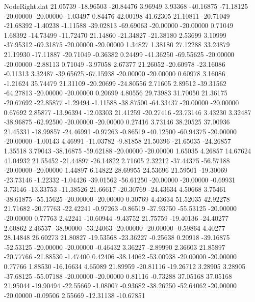 \begin{filecontents}{NodeRight.dat}
  21.05739  -18.96503  -20.84476     3.96949    3.93368  -40.16875  -71.18125  -20.00000  -20.00000   -1.03497    0.84476   42.00198   41.62305
  21.10811  -20.71049  -21.68392    -1.40238   -1.11588  -39.02813  -69.69063  -20.00000  -20.00000    0.71049    1.68392  -14.73499  -11.72470
  21.14860  -21.34827  -21.38180     2.53699    3.10999  -37.95312  -69.31875  -20.00000  -20.00000    1.34827    1.38180   27.12288   33.24879
  21.19930  -17.11887  -20.71049    -0.36382    0.24499  -41.36250  -69.55625  -20.00000  -20.00000   -2.88113    0.71049   -3.97058    2.67377
  21.26052  -20.60978  -23.16086    -0.11313    3.32487  -39.65625  -67.15938  -20.00000  -20.00000    0.60978    3.16086   -1.21624   35.74479
  21.31109  -20.20699  -24.80556     2.71605    2.89512  -39.31562  -64.27813  -20.00000  -20.00000    0.20699    4.80556   29.73983   31.70050
  21.36175  -20.67692  -22.85877    -1.29494   -1.11588  -38.87500  -64.33437  -20.00000  -20.00000    0.67692    2.85877  -13.96394  -12.03303
  21.41259  -20.27416  -23.73146     3.43230    3.32487  -38.96875  -62.92500  -20.00000  -20.00000    0.27416    3.73146   38.20525   37.00936
  21.45331  -18.99857  -24.46991    -0.97263   -0.86519  -40.12500  -60.94375  -20.00000  -20.00000   -1.00143    4.46991  -11.03782   -9.81858
  21.50396  -21.65035  -24.26857     1.35518    3.79043  -38.16875  -59.62188  -20.00000  -20.00000    1.65035    4.26857   14.67624   41.04932
  21.55452  -21.44897  -26.14822     2.71605    2.32212  -37.44375  -56.57188  -20.00000  -20.00000    1.44897    6.14822   28.69955   24.53696
  21.59501  -19.30069  -23.73146    -1.22332   -1.04426  -39.01562  -56.61250  -20.00000  -20.00000   -0.69931    3.73146  -13.33753  -11.38526
  21.66617  -20.30769  -24.43634     4.50668    3.75461  -38.61875  -55.15625  -20.00000  -20.00000    0.30769    4.43634   51.52035   42.92278
  21.71682  -20.77763  -22.42241    -0.97263   -0.86519  -37.93750  -55.53125  -20.00000  -20.00000    0.77763    2.42241  -10.60944   -9.43752
  21.75759  -19.40136  -24.40277     2.60862    2.46537  -38.90000  -53.24063  -20.00000  -20.00000   -0.59864    4.40277   28.14848   26.60273
  21.80827  -19.53568  -23.36227    -0.25638    0.20918  -39.16875  -52.53125  -20.00000  -20.00000   -0.46432    3.36227   -2.89990    2.36603
  21.85897  -20.77766  -21.88530    -1.47400    0.42406  -38.14062  -53.00938  -20.00000  -20.00000    0.77766    1.88530  -16.16634    4.65089
  21.89959  -20.81116  -19.26712     3.28905    3.28905  -37.68125  -55.07188  -20.00000  -20.00000    0.81116   -0.73288   37.05168   37.05168
  21.95044  -19.90494  -22.55669    -1.08007   -0.93682  -38.26250  -52.64062  -20.00000  -20.00000   -0.09506    2.55669  -12.31138  -10.67851

\end{filecontents}
